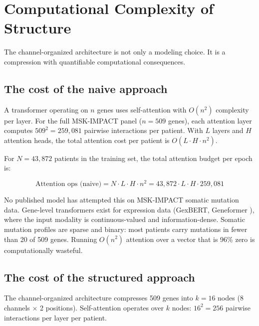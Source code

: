 
\section{Computational Complexity of Structure}
\label{sec:complexity}

The channel-organized architecture is not only a modeling choice.
It is a compression with quantifiable computational consequences.

\subsection{The cost of the naive approach}

A transformer operating on $n$ genes uses self-attention with
$O(n^2)$ complexity per layer. For the full MSK-IMPACT panel
($n = 509$ genes), each attention layer computes $509^2 = 259{,}081$
pairwise interactions per patient. With $L$ layers and $H$ attention
heads, the total attention cost per patient is $O(L \cdot H \cdot n^2)$.

For $N = 43{,}872$ patients in the training set, the total
attention budget per epoch is:

\begin{equation}
\text{Attention ops (naive)} = N \cdot L \cdot H \cdot n^2
= 43{,}872 \cdot L \cdot H \cdot 259{,}081
\end{equation}

No published model has attempted this on MSK-IMPACT somatic
mutation data. Gene-level transformers exist for expression data
(GexBERT, Geneformer \cite{Geneformer2025}), where the input
modality is continuous-valued and information-dense.
Somatic mutation profiles are sparse and binary: most patients
carry mutations in fewer than 20 of 509 genes. Running
$O(n^2)$ attention over a vector that is 96\% zero is
computationally wasteful.

\subsection{The cost of the structured approach}

The channel-organized architecture compresses 509 genes into
$k = 16$ nodes (8 channels $\times$ 2 positions). Self-attention
operates over $k$ nodes: $16^2 = 256$ pairwise interactions per
layer per patient.


